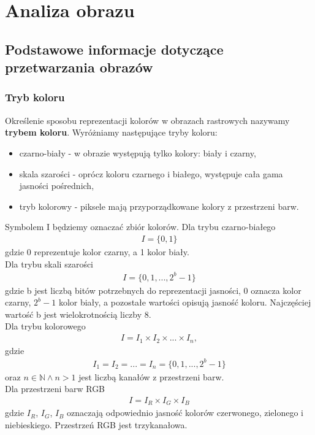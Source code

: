\section{Analiza obrazu}
\subsection{Podstawowe informacje dotyczące przetwarzania obrazów}
\subsubsection{Tryb koloru}
Określenie sposobu reprezentacji kolorów w obrazach rastrowych nazywamy \textbf{trybem koloru}. Wyróżniamy następujące tryby koloru:
\begin{itemize}
  \item czarno-biały - w obrazie występują tylko kolory: biały i czarny,
  \item skala szarości - oprócz koloru czarnego i białego, występuje cała gama jasności pośrednich,
  \item tryb kolorowy - piksele mają przyporządkowane kolory z przestrzeni barw.
\end{itemize}
Symbolem I będziemy oznaczać zbiór kolorów. Dla trybu czarno-białego
\begin{gather*}
  I = \{0, 1\}
\end{gather*} gdzie 0 reprezentuje kolor czarny, a 1 kolor biały.\\
Dla trybu skali szarości
\begin{gather*}
  I = \{0, 1, ..., 2^b-1\}
\end{gather*}
gdzie b jest liczbą bitów potrzebnych do reprezentacji jasności, 0 oznacza kolor czarny, $2^b-1$ kolor biały, a pozostałe wartości opisują jasność koloru. Najczęściej wartość b jest wielokrotnością liczby 8.\\
Dla trybu kolorowego
\begin{gather*}
  I = I_1 \times I_2 \times ... \times I_n,
\end{gather*}
gdzie
\begin{gather*}
  I_1 = I_2 = ... = I_n = \{0, 1, ..., 2^b-1\}
\end{gather*}
oraz $n\in \mathbb{N} \wedge n > 1$ jest liczbą kanałów z przestrzeni barw. \\
Dla przestrzeni barw RGB
\begin{gather*}
  I = I_R \times I_G \times I_B
\end{gather*}
gdzie $I_R$, $I_G$, $I_B$ oznaczają odpowiednio jasność kolorów czerwonego, zielonego i niebieskiego. Przestrzeń RGB jest trzykanałowa.
